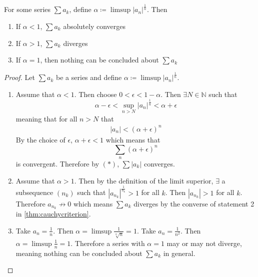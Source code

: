 \documentclass[../notes.tex]{subfiles}
\begin{document}
\begin{theorem}
    For some series $\sum a_k$, define $\alpha \coloneq \limsup |a_n|^{\frac{1}{n}}$. Then
    \begin{enumerate}
        \item If $\alpha < 1$, $\sum a_k$ absolutely converges
        \item If $\alpha > 1$, $\sum a_k$ diverges
        \item If $\alpha = 1$, then nothing can be concluded about $\sum a_k$
    \end{enumerate}
\end{theorem}
\begin{proof}
    Let $\sum a_k$ be a series and define $\alpha \coloneq \limsup |a_n|^{\frac{1}{n}}$.
    \begin{enumerate}
        \item%
        Assume that $\alpha < 1$. Then choose $0 < \epsilon < 1 - \alpha$. Then $\exists N \in \mathbb{N}$ such that
        \[
            \alpha - \epsilon < \sup_{n > N} |a_n|^{\frac{1}{n}} < \alpha + \epsilon
        \]
        meaning that for all $n > N$ that
        \begin{align*}
            |a_n| < (\alpha + \epsilon)^n \tag{$*$}
        \end{align*}
        By the choice of $\epsilon$, $\alpha + \epsilon < 1$ which means that
        \[
            \sum_n (\alpha + \epsilon)^n
        \]
        is convergent. Therefore by $(*)$, $\sum |a_k|$ converges.
        \item%
        Assume that $\alpha > 1$. Then by the definition of the limit superior, $\exists$ a subsequence $(n_k)$ such that $|a_{n_k}|^{\frac{1}{n_k}} > 1$ for all $k$. Then $|a_{n_k}| > 1$ for all $k$. Therefore $a_{n_k} \not\to 0$ which means $\sum a_k$ diverges by the converse of statement 2 in \ref{thm:cauchycriterion}.
        \item%
        Take $a_n = \frac{1}{n}$. Then $\alpha = \limsup \frac{1}{\sqrt[n]{n}} = 1$. Take $a_n = \frac{1}{n^2}$. Then $\alpha = \limsup \frac{1}{n} = 1$. Therefore a series with $\alpha = 1$ may or may not diverge, meaning nothing can be concluded about $\sum a_k$ in general.
    \end{enumerate}
\end{proof}
\end{document}
